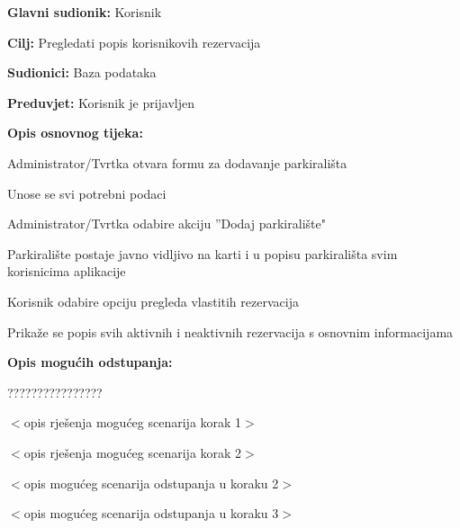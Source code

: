 \noindent {}
\begin{packed_item}
	
	\item \textbf{Glavni sudionik: } Korisnik
	\item  \textbf{Cilj:} Pregledati popis korisnikovih rezervacija
	\item  \textbf{Sudionici:} Baza podataka
	\item  \textbf{Preduvjet:} Korisnik je prijavljen
	\item  \textbf{Opis osnovnog tijeka:}
	
	\item[] \begin{packed_enum}
		
		\item Administrator/Tvrtka otvara formu za dodavanje parkirališta
		\item Unose se svi potrebni podaci
		\item Administrator/Tvrtka odabire akciju ”Dodaj parkiralište"
		\item Parkiralište postaje javno vidljivo na karti i u popisu parkirališta svim korisnicima aplikacije
		\item Korisnik odabire opciju pregleda vlastitih rezervacija
		\item Prikaže se popis svih aktivnih i neaktivnih rezervacija s osnovnim informacijama

	\end{packed_enum}
	
	\item  \textbf{Opis mogućih odstupanja:}
	
	\item[] \begin{packed_item}
		
		\item[2.a] ????????????????
		\item[] \begin{packed_enum}
			
			\item $<$opis rješenja mogućeg scenarija korak 1$>$
			\item $<$opis rješenja mogućeg scenarija korak 2$>$
			
		\end{packed_enum}
		\item[2.b] $<$opis mogućeg scenarija odstupanja u koraku 2$>$
		\item[3.a] $<$opis mogućeg scenarija odstupanja  u koraku 3$>$
		
	\end{packed_item}
\end{packed_item}

